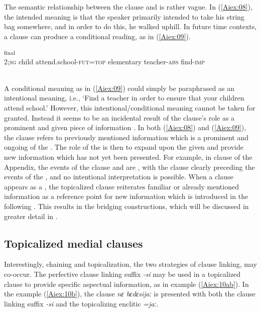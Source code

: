 \documentclass[output=paper]{LSP/langsci}
\begin{document}
The semantic relationship between the  clause and  is rather vague. In (\ref{Aiex:08}), the intended meaning is that the speaker primarily intended to take his string bag somewhere, and in order to do this, he walked uphill. In future time contexts, a  clause can produce a conditional reading, as in (\ref{Aiex:09}).

\begin{exe}
\ex \label{Aiex:09}
\textsubscript{final}\\
2;\textsc{sg}	child	attend.school-\textsc{fut}=\textsc{top}	elementary	teacher-\textsc{abs}	find-\textsc{imp}\\
\glt {}\\
\end{exe}

A conditional meaning as in (\ref{Aiex:09}) could simply be paraphrased as an intentional meaning, i.e., `Find a teacher in order to ensure that your children attend school.'
	However, this intentional/conditional meaning cannot be taken for granted. Instead it seems to be an incidental result of the  clause’s role as a prominent and given piece of information \citep{haiman.1978}. In both (\ref{Aiex:08}) and (\ref{Aiex:09}), the  clause refers to previously mentioned information which is a prominent and ongoing  of the . The role of the  is then to expand upon the given  and provide new information which has not yet been presented. For example, in clause  of the Appendix, the events of the  clause and  are , with the  clause clearly preceding the events of the , and no intentional interpretation is possible. When a clause appears as a , the topicalized clause reiterates familiar or already mentioned information as a reference point for new information which is introduced in the following . This results in the bridging constructions, which will be discussed in greater detail in .

\subsection{Topicalized medial clauses} 
\label{AiTopicalized.medial}
Interestingly, chaining and topicalization, the two strategies of clause linking, may co-occur. The perfective clause linking suffix \textit{-si} may be used in a topicalized clause to provide specific aspectual information, as in example (\ref{Aiex:10ab}). In the example (\ref{Aiex:10b}), the clause \textit{nɛ bɛdɛsijaː} is presented with both the clause linking suffix \textit{-si} and the topicalizing enclitic \textit{=jaː}.
\end{document}
